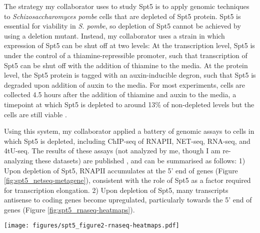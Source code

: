 \documentclass[9pt, letterpaper]{article}
\begin{document}
The strategy my collaborator uses to study Spt5 is to apply genomic techniques to \textit{Schizosaccharomyces pombe} cells that are depleted of Spt5 protein. Spt5 is essential for viability in \textit{S. pombe}, so depletion of Spt5 cannot be achieved by using a deletion mutant. Instead, my collaborator uses a strain in which expression of Spt5 can be shut off at two levels: At the transcription level, Spt5 is under the control of a thiamine-repressible promoter, such that transcription of Spt5 can be shut off with the addition of thiamine to the media. At the protein level, the Spt5 protein is tagged with an auxin-inducible degron, such that Spt5 is degraded upon addition of auxin to the media. For most experiments, cells are collected 4.5 hours after the addition of thiamine and auxin to the media, a timepoint at which Spt5 is depleted to around 13\% of non-depleted levels but the cells are still viable \cite{shetty2017}.

Using this system, my collaborator applied a battery of genomic assays to cells in which Spt5 is depleted, including ChIP-seq of RNAPII, NET-seq, RNA-seq, and 4tU-seq. The results of these assays (not analyzed by me, though I am re-analyzing these datasets) are published \cite{shetty2017}, and can be summarised as follows: 1) Upon depletion of Spt5, RNAPII accumulates at the 5' end of genes (Figure \ref{fig:spt5_netseq-metagene}), consistent with the role of Spt5 as a factor required for transcription elongation. 2) Upon depletion of Spt5, many transcripts antisense to coding genes become upregulated, particularly towards the 5' end of genes (Figure \ref{fig:spt5_rnaseq-heatmaps}).

\begin{SCfigure}[50][h]
\centering
\texttt{[image: figures/spt5\_figure2-rnaseq-heatmaps.pdf]}
\caption{Heatmaps of antisense RNA-seq signal in Spt5 non-depleted and depleted cells, over 1989 non-overlapping coding genes aligned by sense strand genic TSS and sorted by transcript length. Data are shown for each gene up to 300 nt downstream of the cleavage and polyadenylation site (CPS), indicated by the dotted white line. Values are the mean of library-size normalized coverage in non-overlapping 20 nt bins, averaged over two replicates. Values above the 90th percentile are set to the 90th percentile for visualization.}
\label{fig:spt5_rnaseq-heatmaps}
\end{SCfigure}
\end{document}

